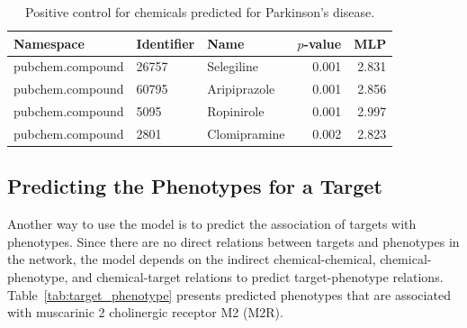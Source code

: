 \begin{table}
    \centering
    \begin{tabular}{|l|l|l|r|r|}
        \hline
        \textbf{Namespace} & \textbf{Identifier} & \textbf{Name} & \textbf{$p$-value} & \textbf{MLP} \\
        \hline
        pubchem.compound & 26757 & Selegiline & 0.001 & 2.831 \\
        \hline
        pubchem.compound & 60795 & Aripiprazole & 0.001 & 2.856 \\
        \hline
        pubchem.compound & 5095 & Ropinirole & 0.001 & 2.997 \\
        \hline
        pubchem.compound & 2801 & Clomipramine & 0.002 & 2.823 \\
        \hline
    \end{tabular}
    \caption{Positive control for chemicals predicted for Parkinson's disease.}
    \label{tab:ps_PD}
\end{table}

\subsection{Predicting the Phenotypes for a Target}

Another way to use the model is to predict the association of targets with phenotypes.
Since there are no direct relations between targets and phenotypes in the network, the model depends on the indirect chemical-chemical, chemical-phenotype, and chemical-target relations to predict target-phenotype relations.
Table~\ref{tab:target_phenotype} presents predicted phenotypes that are associated with muscarinic 2 cholinergic receptor M2 (M2R).

